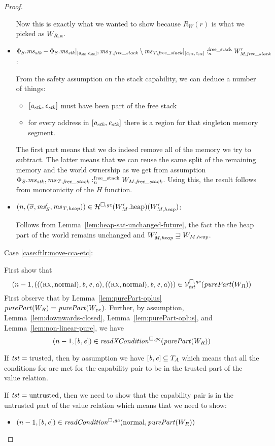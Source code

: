 \begin{proof}
\begin{itemize}
    Now this is exactly what we wanted to show because $R_W(r)$ is what we picked as $W_{R,\aaddr}$.
  \item $\memSatFStack{\Phi_S.\ms_\stk - \Phi_S.\ms_\stk|_{[\aaddr_\stk,\eaddr_\stk]},\ms_\var{T,free\_stack} \setminus \ms_\var{T,free\_stack}|_{[\aaddr_\stk,\eaddr_\stk]}}{W_{M,\var{free\_stack}}'}$:

    From the safety assumption on the stack capability, we can deduce a number of things:
    \begin{itemize}
    \item $[\aaddr_\stk,\eaddr_\stk]$ must have been part of the free stack
    \item for every address in $[\aaddr_\stk,\eaddr_\stk]$ there is a region for that singleton memory segment.
    \end{itemize}
    The first part means that we do indeed remove all of the memory we try to subtract.
    The latter means that we can reuse the same split of the remaining memory and the world ownership as we get from assumption $\memSatFStack{\Phi_S.\ms_\stk,\ms_\var{T,free\_stack}}{W_{M,\var{free\_stack}}}$.
    Using this, the result follows from monotonicity of the $H$ function.

  \item $\npair{(\overline{\sigma},\ms_S',\ms_\var{T,heap})} \in \lrheap(\pwheap[W_M'])(W_{M,\var{heap}}')$:

    Follows from Lemma~\ref{lem:heap-sat-unchanged-future}, the fact the the heap part of the world remains unchanged and $W_{M,\var{heap}}' \future W_{M,\var{heap}}$.
  \end{itemize}

  Case \ref{case:ftlr:move-cca-etc}:

  First show that
  \[
    \npair[n-1]{(((\rx,\normal),\baddr,\eaddr,\aaddr),((\rx,\normal),\baddr,\eaddr,\aaddr))} \in \lrvg{\trust}(\purePart{W_R})
  \]
  First observe that by Lemma~\ref{lem:purePart-oplus} $\purePart{W_R} = \purePart{W_\pcreg}$.
  Further, by assumption, Lemma~\ref{lem:downwards-closed}, Lemma~\ref{lem:purePart-oplus}, and Lemma~\ref{lem:non-linear-pure}, we have
  \[
    \npair[n-1]{[\baddr,\eaddr]} \in \xReadCond{}(\purePart{W_R})
  \]

  If $\trust = \trusted$, then by assumption we have $[\baddr,\eaddr] \subseteq \ta$ which means that all the conditions for are met for the capability pair to be in the trusted part of the value relation.

  If $\trust = \untrusted$, then we need to show that the capability pair is in the untrusted part of the value relation which means that we need to show:
  \begin{itemize}
  \item $\npair[n-1]{[\baddr,\eaddr]} \in \readCond{}(\normal,\purePart{W_R})$


\end{itemize}
\end{proof}
